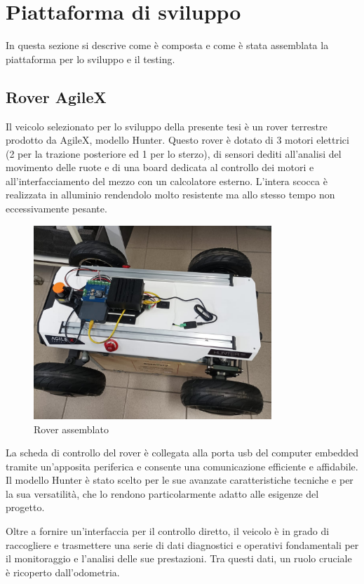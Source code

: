 \section{Piattaforma di sviluppo} \label{piattaforma_di_sviluppo}
In questa sezione si descrive come è composta e come è stata assemblata la piattaforma per lo sviluppo e il testing.

\subsection{Rover AgileX}
Il veicolo selezionato per lo sviluppo della presente tesi è un rover terrestre prodotto da AgileX, modello Hunter. Questo rover è dotato di 3 motori elettrici (2 per la trazione posteriore ed 1 per lo sterzo), di sensori dediti all'analisi del movimento delle ruote e di una board dedicata al controllo dei motori e all'interfacciamento del mezzo con un calcolatore esterno. L'intera scocca è realizzata in alluminio rendendolo molto resistente ma allo stesso tempo non eccessivamente pesante.

\begin{figure}[H]
  \centering
  \includegraphics[width=0.8\textwidth]{figures/franco.png}
  \caption{Rover assemblato}
  \label{Rover assemblato}
\end{figure}

\noindent La scheda di controllo del rover è collegata alla porta usb del computer embedded tramite un'apposita periferica e consente una comunicazione efficiente e affidabile. Il modello Hunter è stato scelto per le sue avanzate caratteristiche tecniche e per la sua versatilità, che lo rendono particolarmente adatto alle esigenze del progetto.

\noindent Oltre a fornire un'interfaccia per il controllo diretto, il veicolo è in grado di raccogliere e trasmettere una serie di dati diagnostici e operativi fondamentali per il monitoraggio e l'analisi delle sue prestazioni. Tra questi dati, un ruolo cruciale è ricoperto dall'odometria. 

